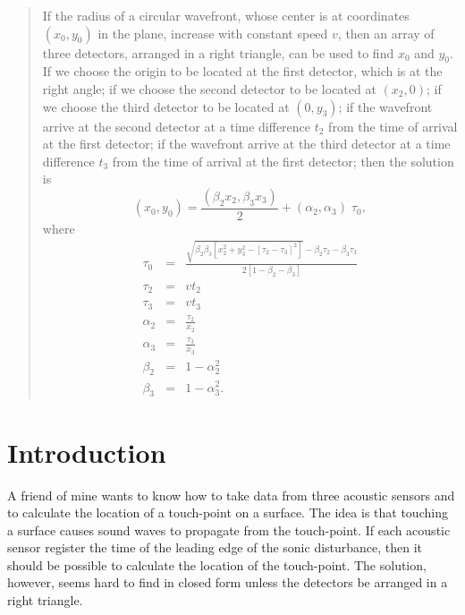 \documentclass[twocolumn]{article}
\begin{document}
\thispagestyle{fancy}

\begin{abstract}
   If the radius of a circular wavefront, whose center is at coordinates
   $(x_0,y_0)$ in the plane, increase with constant speed $v$, then an array of
   three detectors, arranged in a right triangle, can be used to find $x_0$ and
   $y_0$.  If we choose the origin to be located at the first detector, which
   is at the right angle; if we choose the second detector to be located at
   $(x_2, 0)$; if we choose the third detector to be located at $(0, y_3)$; if
   the wavefront arrive at the second detector at a time difference $t_2$ from
   the time of arrival at the first detector; if the wavefront arrive at the
   third detector at a time difference $t_3$ from the time of arrival at the
   first detector; then the solution is
   \begin{equation*}
      (x_0, y_0) = \frac{(\beta_2 x_2, \beta_3 x_3)}{2} + (\alpha_2, \alpha_3)
                   \; \tau_0,
   \end{equation*}
   where
   \begin{eqnarray*}
      \tau_0 &=& \frac{\sqrt{\beta_2 \beta_3 \left[x_2^2 + y_3^2 - \left[\tau_2
                 - \tau_3\right]^2\right]} - \beta_2 \tau_2 - \beta_3 \tau_3}{2
                 \left[1 - \beta_2 - \beta_3\right]}\\[5pt]
      \tau_2 &=& vt_2\\
      \tau_3 &=& vt_3\\[5pt]
      \alpha_2 &=& \frac{\tau_2}{x_2}\\[5pt]
      \alpha_3 &=& \frac{\tau_3}{x_3}\\[5pt]
      \beta_2 &=& 1 - \alpha_2^2\\[5pt]
      \beta_3 &=& 1 - \alpha_3^2.
   \end{eqnarray*}
\end{abstract}

\section{Introduction}

A friend of mine wants to know how to take data from three acoustic sensors and
to calculate the location of a touch-point on a surface.  The idea is that
touching a surface causes sound waves to propagate from the touch-point. If
each acoustic sensor register the time of the leading edge of the sonic
disturbance, then it should be possible to calculate the location of the
touch-point.  The solution, however, seems hard to find in closed form unless
the detectors be arranged in a right triangle.
\end{document}
